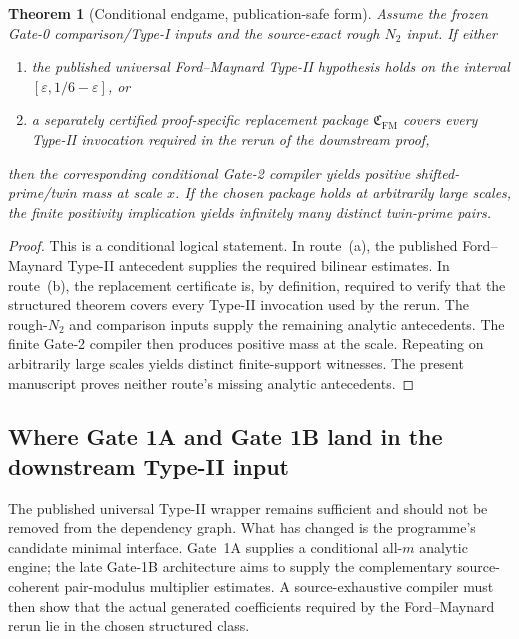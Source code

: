 \documentclass[11pt]{article}
\newtheorem{theorem}{Theorem}[section]
\theoremstyle{definition}
\newcommand{\1}{\mathbf 1}
\begin{document}
\begin{theorem}[Conditional endgame, publication-safe form]
\label{thm:conditional-endgame}
Assume the frozen Gate-0 comparison/Type-I inputs and the source-exact rough
$N_2$ input.  If either
\begin{enumerate}[label=(\alph*)]
  \item the published universal Ford--Maynard Type-II hypothesis holds on the
        interval $[\varepsilon,1/6-\varepsilon]$, or
  \item a separately certified proof-specific replacement package
        $\mathfrak C_{\mathrm{FM}}$ covers every Type-II invocation required in
        the rerun of the downstream proof,
\end{enumerate}
then the corresponding conditional Gate-2 compiler yields positive
shifted-prime/twin mass at scale $x$.  If the chosen package holds at
arbitrarily large scales, the finite positivity implication yields infinitely
many distinct twin-prime pairs.
\end{theorem}
\begin{proof}
This is a conditional logical statement.  In route~(a), the published
Ford--Maynard Type-II antecedent supplies the required bilinear estimates.  In
route~(b), the replacement certificate is, by definition, required to verify
that the structured theorem covers every Type-II invocation used by the
rerun.  The rough-$N_2$ and comparison inputs supply the remaining analytic
antecedents.  The finite Gate-2 compiler then produces positive mass at the
scale.  Repeating on arbitrarily large scales yields distinct finite-support
witnesses.  The present manuscript proves neither route's missing analytic
antecedents.
\end{proof}

\subsection{Where Gate 1A and Gate 1B land in the downstream Type-II input}
The published universal Type-II wrapper remains sufficient and should not be
removed from the dependency graph.  What has changed is the programme's
candidate minimal interface.  Gate~1A supplies a conditional all-$m$ analytic
engine; the late Gate-1B architecture aims to supply the complementary
source-coherent pair-modulus multiplier estimates.  A source-exhaustive
compiler must then show that the actual generated coefficients required by the
Ford--Maynard rerun lie in the chosen structured class.
\end{document}
